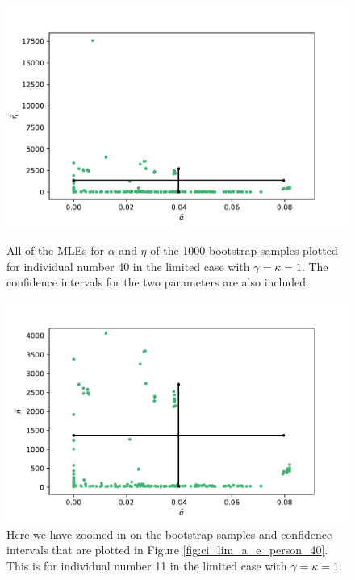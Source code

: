 \begin{figure}
    \centering
    \begin{minipage}{0.48\textwidth}
        \centering
        \includegraphics[scale=0.32]{pictures/ci_lim_a_e_person40_pdf.pdf}
        \caption[MLEs for $\alpha$ and $\eta$ for bootstrap samples individual 40, limited]{All of the MLEs for $\alpha$ and $\eta$ of the 1000 bootstrap samples plotted for individual number 40 in the limited case with $\gamma=\kappa=1$. The confidence intervals for the two parameters are also included.}
        \label{fig:ci_lim_a_e_person_40}
    \end{minipage}\hfill
    \begin{minipage}{0.48\textwidth}
        \centering
        \includegraphics[scale=0.32]{pictures/ci_lim_a_e_person40_zoomed_pdf.pdf}
        \caption[MLEs for $\alpha$ and $\eta$ of bootstrap samples individual 40, limited, zoomed]{Here we have zoomed in on the bootstrap samples and confidence intervals that are plotted in Figure \ref{fig:ci_lim_a_e_person_40}. This is for individual number 11 in the limited case with $\gamma=\kappa=1$.}
        \label{fig:ci_lim_a_e_person_40_zoomed}
    \end{minipage}
\end{figure}
